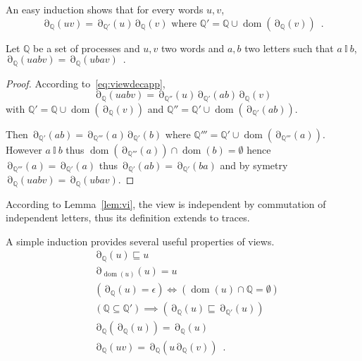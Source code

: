 \documentclass[a4paper,UKenglish]{lipics-v2016}
\newcommand{\QQ}{\mathbb{Q}}
\newcommand{\ind}{~\mathbb{I}~}
\newcommand{\pref}{\sqsubseteq}
\DeclareMathOperator{\dom}{dom}
\DeclareMathOperator{\view}{\partial}
\begin{document}
An easy induction shows that for every words $u,v$,
\begin{equation}
\label{eq:viewdecapp}
\view_\QQ(uv)=\view_{\QQ'}(u)\view_\QQ(v)
\text{ where }
\QQ'=\QQ\cup \dom(\view_\QQ(v))\enspace.
\end{equation}


\begin{lemma}\label{lem:vi}
Let $\QQ$ be a set of processes and $u,v$ two words and $a,b$ two letters such that $a \ind b$,
$
\view_\QQ(uabv)=\view_\QQ(ubav)\enspace.
$
\end{lemma}
\begin{proof}
According to~\eqref{eq:viewdecapp},
\[
\view_\QQ(uabv)
=
\view_{\QQ''}(u)
\view_{\QQ'}(ab)
\view_\QQ(v)
\]
with $\QQ'= \QQ \cup \dom(\view_\QQ(v))$
and $\QQ''= \QQ'\cup \dom(\view_{\QQ'}(ab))$.

Then $\view_{\QQ'}(ab)=\view_{\QQ'''}(a)\view_{\QQ'}(b)$
where $\QQ'''=\QQ'\cup\dom(\view_{\QQ'''}(a))$. However $a\ind b$ thus 
$\dom(\view_{\QQ'''}(a))\cap \dom(b)=\emptyset$ hence $\view_{\QQ'''}(a)=\view_{\QQ'}(a)$ thus
$\view_{\QQ'}(ab)=\view_{\QQ'}(ba)$
and by symetry
$\view_\QQ(uabv)=\view_\QQ(ubav)$.
\end{proof}

According to Lemma~\ref{lem:vi},
the view is independent by commutation of independent letters, thus its definition extends to traces.

A simple induction provides several useful properties of views.
\begin{align}
\label{viewpref}
&\view_\QQ(u) \pref u\\
\label{viewall}
&\view_{\dom(u)}(u)=u
\\
\label{viewempty}
& (\view_\QQ(u)=\epsilon) \iff (\dom(u)\cap \QQ=\emptyset)
\\
\label{viewsubapp}
& (\QQ\subseteq \QQ') \implies 
(\view_\QQ(u)
 \pref
\view_{\QQ'}(u))\\
\label{eq:viewview2}
&\text{$\view_\QQ(\view_\QQ(u)) = \view_\QQ(u)$}\\
\label{eq:viewview}
&\text{$\view_\QQ(uv) = \view_\QQ(u\view_\QQ(v))$}
\enspace.
\end{align}
\end{document}
